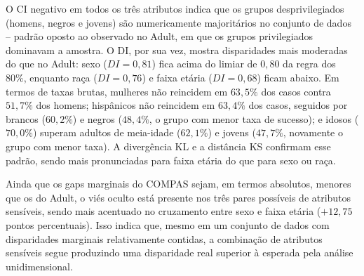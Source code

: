 O CI negativo em todos os três atributos indica que os grupos desprivilegiados (homens, negros e jovens) são numericamente majoritários no conjunto de dados -- padrão oposto ao observado no Adult, em que os grupos privilegiados dominavam a amostra. O DI, por sua vez, mostra disparidades mais moderadas do que no Adult: sexo ($DI=0,81$) fica acima do limiar de $0,80$ da regra dos 80\%, enquanto raça ($DI=0,76$) e faixa etária ($DI=0,68$) ficam abaixo. Em termos de taxas brutas, mulheres não reincidem em $63,5\%$ dos casos contra $51,7\%$ dos homens; hispânicos não reincidem em $63,4\%$ dos casos, seguidos por brancos ($60,2\%$) e negros ($48,4\%$, o grupo com menor taxa de sucesso); e idosos ($70,0\%$) superam adultos de meia-idade ($62,1\%$) e jovens ($47,7\%$, novamente o grupo com menor taxa). A divergência KL e a distância KS confirmam esse padrão, sendo mais pronunciadas para faixa etária do que para sexo ou raça.

\begin{table}[H]
    \centering
    \caption{Resultados da auditoria de viés interseccional oculto em pares de atributos sensíveis (COMPAS).}
    \vspace{2mm}
    \label{tab:compas_gerrymandering_audit}
\end{table}

Ainda que os gaps marginais do COMPAS sejam, em termos absolutos, menores que os do Adult, o viés oculto está presente nos três pares possíveis de atributos sensíveis, sendo mais acentuado no cruzamento entre sexo e faixa etária ($+12,75$ pontos percentuais). Isso indica que, mesmo em um conjunto de dados com disparidades marginais relativamente contidas, a combinação de atributos sensíveis segue produzindo uma disparidade real superior à esperada pela análise unidimensional.

